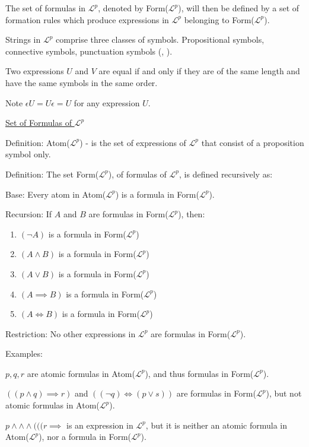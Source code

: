 \documentclass{article}
\begin{document}
The set of formulas in $\mathcal{L}^p$, denoted by Form($\mathcal{L}^p$), will then be defined by a set of formation rules which produce expressions in $\mathcal{L}^p$ belonging to Form($\mathcal{L}^p$).


Strings in $\mathcal{L}^p$ comprise three classes of symbols. Propositional symbols, connective symbols, punctuation symbols (, ).

Two expressions $U$ and $V$ are equal if and only if they are of the same length and have the same symbols in the same order. 

Note $\epsilon U = U \epsilon = U$ for any expression $U$. 

\underline{Set of Formulas of $\mathcal{L}^p$}

Definition: Atom($\mathcal{L}^p$) - is the set of expressions of $\mathcal{L}^p$ that consist of a proposition symbol only. 

Definition: The set Form($\mathcal{L}^p$), of formulas of $\mathcal{L}^p$, is defined recursively as:

Base: Every atom in Atom($\mathcal{L}^p$) is a formula in Form($\mathcal{L}^p$). 

Recursion: If $A$ and $B$ are formulas in Form($\mathcal{L}^p$), then:
\begin{enumerate}
    \item $(\neg A)$ is a formula in Form($\mathcal{L}^p$)
    \item $(A \wedge B)$ is a formula in Form($\mathcal{L}^p$)
    \item $(A \vee B)$ is a formula in Form($\mathcal{L}^p$)
    \item $(A \implies B)$ is a formula in Form($\mathcal{L}^p$)
    \item $(A \iff B)$ is a formula in Form($\mathcal{L}^p$)
\end{enumerate}

Restriction: No other expressions in $\mathcal{L}^p$ are formulas in Form($\mathcal{L}^p$).

Examples:

$p,q,r$ are atomic formulas in Atom($\mathcal{L}^p$), and thus formulas in Form($\mathcal{L}^p$). 

$((p \wedge q) \implies r)$ and $((\neg q) \iff (p \vee s))$ are formulas in Form($\mathcal{L}^p$), but not atomic formulas in Atom($\mathcal{L}^p$). 

$p \wedge \wedge \wedge ((( r \implies$ is an expression in $\mathcal{L}^p$, but it is neither an atomic formula in Atom($\mathcal{L}^p$), nor a formula in Form($\mathcal{L}^p$). 
\end{document}
